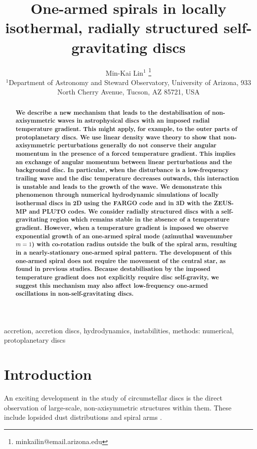 \documentclass[useAMS,usenatbib]{mn2e}
\title[One-armed spirals]{One-armed spirals in 
  locally isothermal, radially structured self-gravitating discs}
\author[Lin]{Min-Kai Lin$^{1}$
  \thanks{ minkailin@email.arizona.edu} \\ 
  $^1$Department of Astronomy and Steward Observatory, University of
  Arizona, 933 North Cherry Avenue, Tucson, AZ 85721, USA 
}
\begin{document}
\maketitle
\begin{abstract} 
  {\bf We describe a new mechanism that leads to the destabilisation of
 non-axisymmetric waves in astrophysical discs with 
 an imposed radial temperature gradient. This might apply, for
 example, to the outer parts of protoplanetary discs. We use linear
 density wave theory 
 to show that non-axisymmetric perturbations generally do not conserve
 their angular momentum in the presence of a forced temperature
 gradient. This implies an exchange of angular momentum
 between linear perturbations and the background disc. In particular, 
 when the disturbance is a low-frequency
 trailing wave and the disc temperature decreases outwards, this 
 interaction is unstable and leads to the growth of the wave.  
 We demonstrate this phenomenon through numerical hydrodynamic
 simulations of locally isothermal discs in 2D using the FARGO
 code and in 3D with  the ZEUS-MP and PLUTO codes.  We consider
 radially structured discs with a self-gravitating region which remains
 stable in the absence of a temperature gradient. However,
 when a temperature gradient is imposed we observe exponential growth of an one-armed  
 spiral mode (azimuthal wavenumber $m=1$) with co-rotation radius 
 outside the bulk of the spiral arm, resulting in a nearly-stationary
 one-armed spiral pattern.  The development of this one-armed 
 spiral does not require the movement of the central star, as found in previous studies. 
 Because destabilisation by the imposed temperature gradient does 
 not explicitly require disc self-gravity, we suggest this mechanism may also
 affect low-frequency one-armed oscillations in non-self-gravitating
 discs. 
}
\end{abstract}



\begin{keywords}
  accretion, accretion discs, hydrodynamics, instabilities, methods: numerical, protoplanetary discs 
\end{keywords}

\section{Introduction}\label{intro}
An exciting development in the study of circumstellar 
discs is the direct observation of large-scale, non-axisymmetric
structures within them. These
include lopsided dust distributions 
\citep{marel13,fukagawa13,casassus13,isella13,perez14,follette14} and
spiral arms 
\citep{hashimoto11,muto12,boccaletti14,grady13,christiaens14,avenhaus14}. 
\end{document}
